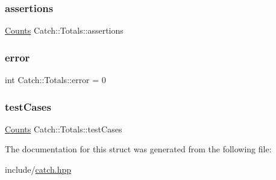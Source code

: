 \subsubsection{\texorpdfstring{assertions}{assertions}}
{\footnotesize\ttfamily \mbox{\hyperlink{struct_catch_1_1_counts}{Counts}} Catch\+::\+Totals\+::assertions}

\mbox{\label{struct_catch_1_1_totals_a6ea14c7de7ea735a14f172a26e08a239}} 
\subsubsection{\texorpdfstring{error}{error}}
{\footnotesize\ttfamily int Catch\+::\+Totals\+::error = 0}

\mbox{\label{struct_catch_1_1_totals_adb195fe477aedee2ecea88c888f16506}} 
\subsubsection{\texorpdfstring{testCases}{testCases}}
{\footnotesize\ttfamily \mbox{\hyperlink{struct_catch_1_1_counts}{Counts}} Catch\+::\+Totals\+::test\+Cases}



The documentation for this struct was generated from the following file\+:\begin{DoxyCompactItemize}
\item 
include/\mbox{\hyperlink{catch_8hpp}{catch.\+hpp}}\end{DoxyCompactItemize}
